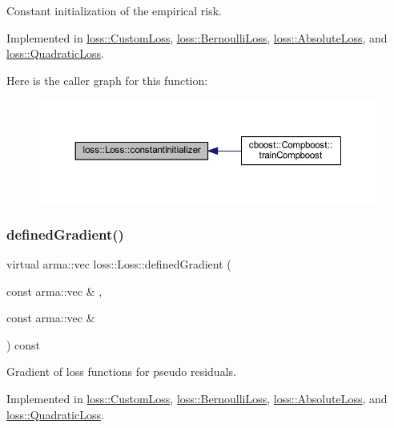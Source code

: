Constant initialization of the empirical risk. 



Implemented in \mbox{\hyperlink{classloss_1_1_custom_loss_adf283025a8511731504cd5b620cc8b37}{loss\+::\+Custom\+Loss}}, \mbox{\hyperlink{classloss_1_1_bernoulli_loss_a1b5e26f446f30d690abc625349f563d1}{loss\+::\+Bernoulli\+Loss}}, \mbox{\hyperlink{classloss_1_1_absolute_loss_aa2ac5fb1fdf3ce0f48decd77d375ef76}{loss\+::\+Absolute\+Loss}}, and \mbox{\hyperlink{classloss_1_1_quadratic_loss_a43989f3fbecc27351513afe1136cdf38}{loss\+::\+Quadratic\+Loss}}.

Here is the caller graph for this function\+:
\nopagebreak
\begin{figure}[H]
\begin{center}
\leavevmode
\includegraphics[width=350pt]{classloss_1_1_loss_a65fe7dcd9370e6a549b8d1cc95fc8798_icgraph}
\end{center}
\end{figure}
\mbox{\label{classloss_1_1_loss_a267a4de70747ade4b2d84ce35a448979}} 
\subsubsection{\texorpdfstring{defined\+Gradient()}{definedGradient()}}
{\footnotesize\ttfamily virtual arma\+::vec loss\+::\+Loss\+::defined\+Gradient (\begin{DoxyParamCaption}\item[{const arma\+::vec \&}]{,  }\item[{const arma\+::vec \&}]{ }\end{DoxyParamCaption}) const\hspace{0.3cm}{\ttfamily [pure virtual]}}



Gradient of loss functions for pseudo residuals. 



Implemented in \mbox{\hyperlink{classloss_1_1_custom_loss_a3a79dc019e781c2956b52fb8e1cfcc56}{loss\+::\+Custom\+Loss}}, \mbox{\hyperlink{classloss_1_1_bernoulli_loss_a2dc644172cea3eb84f1af5aa9217c04a}{loss\+::\+Bernoulli\+Loss}}, \mbox{\hyperlink{classloss_1_1_absolute_loss_a1886fc8ca065c6f0a207b7a8a0f8444d}{loss\+::\+Absolute\+Loss}}, and \mbox{\hyperlink{classloss_1_1_quadratic_loss_adb4da1acbad702b5ba8570abaa17d373}{loss\+::\+Quadratic\+Loss}}.

